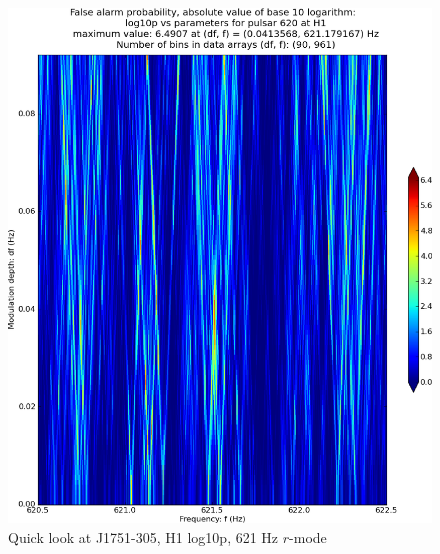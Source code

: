 \begin{figure}
\begin{center}
\includegraphics[width=0.4\paperwidth,height=0.2\paperheight]{plots/DFvsFresultsProb-H1_pulsar-620.eps}
\caption{
Quick look at J1751-305, H1 log10p, 621 Hz $r$-mode}
\end{center}
\end{figure}


